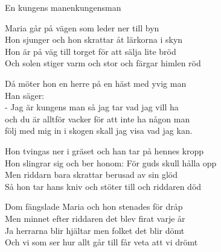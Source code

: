 \begin{song}{En kungens man}{enkungensman} 
\begin{vers}
Maria går på vägen som leder ner till byn\\
Hon sjunger och hon skrattar åt lärkorna i skyn\\
Hon är på väg till torget för att sälja lite bröd\\
Och solen stiger varm och stor och färgar himlen röd\\
\end{vers}
\begin{vers}
Då möter hon en herre på en häst med yvig man\\
Han säger:\\
- Jag är kungens man så jag tar vad jag vill ha\\
och du är alltför vacker för att inte ha någon man\\
följ med mig in i skogen skall jag visa vad jag kan.\\
\end{vers}
\begin{vers}
Hon tvingas ner i gräset och han tar på hennes kropp\\
Hon slingrar sig och ber honom: För guds skull hålla opp\\
Men riddarn bara skrattar berusad av sin glöd\\
Så hon tar hans kniv och stöter till och riddaren död\\
\end{vers}
\begin{vers}
Dom fängslade Maria och hon stenades för dråp\\
Men minnet efter riddaren det blev firat varje år\\
Ja herrarna blir hjältar men folket det blir dömt\\
Och vi som ser hur allt går till får veta att vi drömt\\
\end{vers}
\end{song}

\newpage

